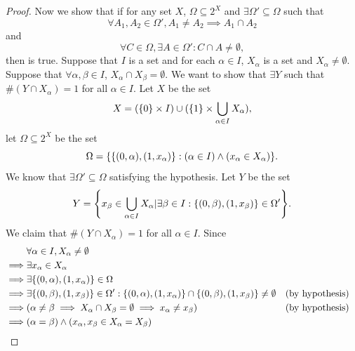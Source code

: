 \begin{proof}
  Now we show that if for any set \(X\), \(\Omega \subseteq 2^X\) and \(\exists \Omega' \subseteq \Omega\) such that
  \[
    \forall A_1, A_2 \in \Omega', A_1 \neq A_2 \implies A_1 \cap A_2
  \]
  and
  \[
    \forall C \in \Omega, \exists A \in \Omega' : C \cap A \neq \emptyset,
  \]
  then  is true.
  Suppose that \(I\) is a set and for each \(\alpha \in I\), \(X_{\alpha}\) is a set and \(X_{\alpha} \neq \emptyset\).
  Suppose that \(\forall \alpha, \beta \in I\), \(X_{\alpha} \cap X_{\beta} = \emptyset\).
  We want to show that \(\exists Y\) such that \(\#(Y \cap X_{\alpha}) = 1\) for all \(\alpha \in I\).
  Let \(X\) be the set
  \[
    X = (\left\lbrace0\right\rbrace \times I) \cup (\left\lbrace1\right\rbrace \times \bigcup_{\alpha \in I} X_{\alpha}),
  \]
  let \(\Omega \subseteq 2^X\) be the set
  \[
    \Omega = \set{\set{(0, \alpha), (1, x_{\alpha})} : (\alpha \in I) \land (x_{\alpha} \in X_{\alpha})}.
  \]
  We know that \(\exists \Omega' \subseteq \Omega\) satisfying the hypothesis.
  Let \(Y\) be the set
  \[
    Y = \set{x_{\beta} \in \bigcup_{\alpha \in I} X_{\alpha} | \exists \beta \in I : \set{(0, \beta), (1, x_{\beta})} \in \Omega'}.
  \]
  We claim that \(\#(Y \cap X_{\alpha}) = 1\) for all \(\alpha \in I\).
  Since
  \begin{align*}
             & \forall \alpha \in I, X_{\alpha} \neq \emptyset                                                                                                                            \\
    \implies & \exists x_{\alpha} \in X_{\alpha}                                                                                                                                          \\
    \implies & \exists \set{(0, \alpha), (1, x_{\alpha})} \in \Omega                                                                                                                      \\
    \implies & \exists \set{(0, \beta), (1, x_{\beta})} \in \Omega' : \set{(0, \alpha), (1, x_{\alpha})} \cap \set{(0, \beta), (1, x_{\beta})} \neq \emptyset &  & \text{(by hypothesis)} \\
    \implies & (\alpha \neq \beta \implies X_{\alpha} \cap X_{\beta} = \emptyset \implies x_{\alpha} \neq x_{\beta})                                          &  & \text{(by hypothesis)} \\
    \implies & (\alpha = \beta) \land (x_{\alpha}, x_{\beta} \in X_{\alpha} = X_{\beta})                                                                                                  \\

\end{align*}
\end{proof}
